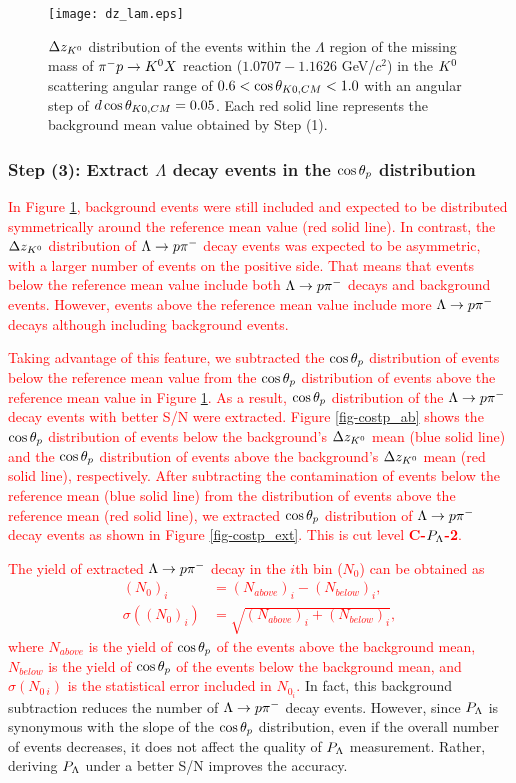 \begin{figure}[h]
  \centering
  \texttt{[image: dz\_lam.eps]}
  \caption{$\Delta z_{K^{0}}$ distribution of the events within the $\Lambda$ region of the missing mass of $\pi^- p \to K^0 X$ reaction ($1.0707-1.1626$ GeV/$c^{2}$) in the $K^{0}$ scattering angular range of $0.6<\cos{\theta_{K0,CM}}<1.0$ with an angular step of $d\cos{\theta_{K0,CM}}=0.05$. Each red solid line represents the background mean value obtained by Step (1).}
  \label{fig-dz_lam}
\end{figure}


\subsubsection{Step (3): Extract $\Lambda$ decay events in the $\cos{\theta_p}$ distribution}
\label{subsubsec-extcostp}

\textcolor{red}{ In Figure \ref{fig-dz_lam}, background events were still included and expected to be distributed symmetrically around the reference mean value (red solid line). In contrast, the $\Delta z_{K^{0}}$ distribution of $\Lambda\to p\pi^{-}$ decay events was expected to be asymmetric, with a larger number of events on the positive side. That means that events below the reference mean value include both $\Lambda\to p\pi^{-}$ decays and background events. However, events above the reference mean value include more $\Lambda\to p\pi^{-}$ decays although including background events. }

\textcolor{red}{ Taking advantage of this feature, we subtracted the $\cos{\theta_p}$ distribution of events below the reference mean value from the $\cos{\theta_p}$ distribution of events above the reference mean value in Figure \ref{fig-dz_lam}. As a result, $\cos{\theta_p}$ distribution of the $\Lambda\to p\pi^{-}$ decay events with better S/N were extracted. Figure \ref{fig-costp_ab} shows the $\cos{\theta_p}$ distribution of events below the background's $\Delta z_{K^{0}}$ mean (blue solid line) and the $\cos{\theta_p}$ distribution of events above the background's $\Delta z_{K^{0}}$ mean (red solid line), respectively. After subtracting the contamination of events below the reference mean (blue solid line) from the distribution of events above the reference mean (red solid line), we extracted $\cos{\theta_p}$ distribution of $\Lambda\to p\pi^{-}$ decay events as shown in Figure \ref{fig-costp_ext}. This is cut level {\bf C-$P_{\Lambda}$-2}. }

\textcolor{red}{The yield of extracted $\Lambda\to p\pi^{-}$ decay in the $i$th bin ($N_0$) can be obtained as
\begin{align}
  (N_{0})_i &= (N_{above})_i - (N_{below})_i, \\
  \sigma((N_{0})_i) &= \sqrt{(N_{above})_i + (N_{below})_i},
\end{align}
where $N_{above}$ is the yield of $\cos{\theta_p}$ of the events above the background mean, $N_{below}$ is the yield of $\cos{\theta_p}$ of the events below the background mean, and $\sigma(N_{0\ i})$ is the statistical error included in $N_{0_i}$. } In fact, this background subtraction reduces the number of $\Lambda\to p\pi^{-}$ decay events. However, since $P_{\Lambda}$ is synonymous with the slope of the $\cos{\theta_p}$ distribution, even if the overall number of events decreases, it does not affect the quality of $P_{\Lambda}$ measurement. Rather, deriving $P_{\Lambda}$ under a better S/N improves the accuracy.

